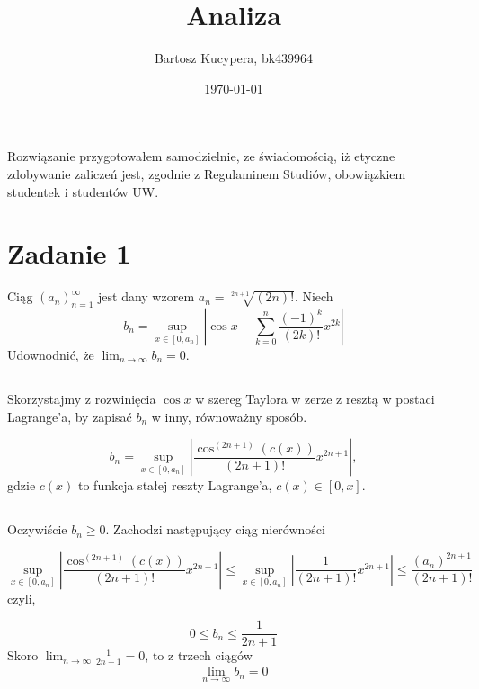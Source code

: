 \documentclass{article}
\title{Analiza}
\author{Bartosz Kucypera, bk439964}
\date{\today}
\begin{document}
\maketitle

Rozwiązanie przygotowałem samodzielnie, ze świadomością, iż etyczne zdobywanie zaliczeń jest, zgodnie z Regulaminem Studiów, obowiązkiem studentek i studentów UW.

\section*{Zadanie 1} 
Ciąg $(a_n)_{n=1}^{\infty}$ jest dany wzorem $a_n=\sqrt[2n+1]{(2n)!}$. Niech
$$b_n=\sup_{x\in[0,a_n]} \left| \cos{x}-\sum_{k=0}^{n}\frac{(-1)^k}{(2k)!}x^{2k} \right|$$
Udownodnić, że $\displaystyle \lim_{n\to \infty}b_n=0$.

\subsection*{}
Skorzystajmy z rozwinięcia $\cos{x}$ w szereg Taylora w zerze z resztą w postaci Lagrange’a, by zapisać $b_n$ w inny, równoważny sposób.

$$ b_n = \sup_{x\in[0,a_n]} \left| \frac{\cos^{(2n+1)}(c(x))}{(2n+1)!}x^{2n+1} \right|,$$
gdzie $c(x)$ to funkcja stałej reszty Lagrange'a, $c(x)\in[0,x]$.

\subsection*{}
Oczywiście $b_n \ge 0$. Zachodzi następujący ciąg nierówności

$$ \sup_{x\in[0,a_n]} \left| \frac{\cos^{(2n+1)}(c(x))}{(2n+1)!}x^{2n+1} \right| \le 
\sup_{x\in[0,a_n]} \left| \frac{1}{(2n+1)!}x^{2n+1} \right| \le 
\frac{(a_n)^{2n+1}}{(2n+1)!} $$
czyli,

$$ 0 \le b_n \le \frac{1}{2n+1} $$
Skoro $\displaystyle \lim_{n \to \infty} \frac{1}{2n+1} = 0$, to z trzech ciągów 
$$\lim_{n \to \infty} b_n = 0$$
\end{document}
